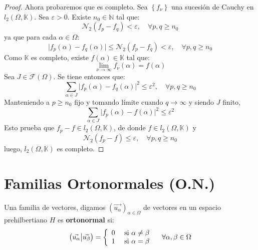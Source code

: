 \documentclass[12pt]{report}
\theoremstyle{largebreak}
\newcommand\abs[1]{\ensuremath{\big|#1\big|}}
\newcommand\pint[2]{\ensuremath{\left(#1\big| #2\right)}}
\begin{document}
\begin{proof}
        Ahora probaremos que es completo. Sea $\left\{f_\nu \right\}$ una sucesión de Cauchy en $l_2(\Omega,\mathbb{K})$. Sea $\varepsilon>0$. Existe $n_0\in\mathbb{N}$ tal que:
        \begin{equation*}
            \mathcal{N}_2(f_p-f_q)<\varepsilon,\quad\forall p,q\geq n_0
        \end{equation*}
        ya que para cada $\alpha\in\Omega$:
        \begin{equation*}
            \abs{f_p(\alpha)-f_q(\alpha)}\leq\mathcal{N}_2(f_p-f_q)<\varepsilon ,\quad\forall p,q\geq n_0
        \end{equation*}
        Como $\mathbb{K}$ es completo, existe $f(\alpha)\in\mathbb{K}$ tal que:
        \begin{equation*}
            \lim_{\nu\rightarrow\infty}f_\nu(\alpha)=f(\alpha)
        \end{equation*}
        Sea $J\in\mathcal{F}(\Omega)$. Se tiene entonces que:
        \begin{equation*}
            \sum_{\alpha\in J}\abs{f_p(\alpha)-f_q(\alpha)}^2\leq\varepsilon^2,\quad\forall p,q\geq n_0
        \end{equation*}
        Manteniendo a $p\geq n_0$ fijo y tomando límite cuando $q\rightarrow\infty$ y siendo $J$ finito,
        \begin{equation*}
            \sum_{\alpha\in J}\abs{f_p(\alpha)-f(\alpha)}^2\leq\varepsilon^2
        \end{equation*}
        Esto prueba que $f_p-f\in l_2(\Omega,\mathbb{K})$, de donde $f\in l_2(\Omega,\mathbb{K})$ y
        \begin{equation*}
            \mathcal{N}_2(f_p-f)\leq \varepsilon,\quad\forall p,q\geq n_0
        \end{equation*}
        luego, $l_2(\Omega,\mathbb{K})$ es completo.
    \end{proof}

    \section{Familias Ortonormales (O.N.)}

    \begin{mydef}
        Una familia de vectores, digamos $\left(\vec{u_\alpha} \right)_{\alpha\in\Omega}$ de vectores en un espacio prehilbertiano $H$ es \textbf{ortonormal} si:
        \begin{equation*}
                \pint{\vec{u_\alpha}}{\vec{u_\beta}}
                =\left\{\begin{array}{lcr}
                    0 & \textup{ si } \alpha\neq\beta\\
                    1 & \textup{ si } \alpha=\beta\\
                \end{array}
                \right.\quad\forall\alpha,\beta\in\Omega
        \end{equation*}
    \end{mydef}
    
\end{document}
